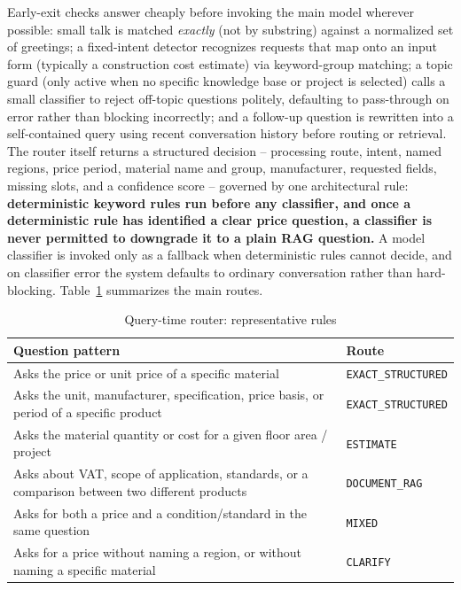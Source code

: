 \documentclass[11pt,a4paper]{article}
\begin{document}
Early-exit checks answer cheaply before invoking the main model wherever
possible: small talk is matched \emph{exactly} (not by substring) against a
normalized set of greetings; a fixed-intent detector recognizes requests
that map onto an input form (typically a construction cost estimate) via
keyword-group matching; a topic guard (only active when no specific
knowledge base or project is selected) calls a small classifier to reject
off-topic questions politely, defaulting to pass-through on error rather
than blocking incorrectly; and a follow-up question is rewritten into a
self-contained query using recent conversation history before routing or
retrieval. The router itself returns a structured decision -- processing
route, intent, named regions, price period, material name and group,
manufacturer, requested fields, missing slots, and a confidence score --
governed by one architectural rule: \textbf{deterministic keyword rules run
before any classifier, and once a deterministic rule has identified a clear
price question, a classifier is never permitted to downgrade it to a plain
RAG question.} A model classifier is invoked only as a fallback when
deterministic rules cannot decide, and on classifier error the system
defaults to ordinary conversation rather than hard-blocking. Table~\ref{tab:router-rules}
summarizes the main routes.

\begin{table}[htbp]
\centering
\caption{Query-time router: representative rules}
\label{tab:router-rules}
\small
\renewcommand{\arraystretch}{1.25}
\begin{tabularx}{\textwidth}{|X|p{}|}
\hline
\rowcolor{tableheader}
\textbf{Question pattern} & \textbf{Route} \\
\hline
Asks the price or unit price of a specific material & \texttt{EXACT\_STRUCTURED} \\
\hline
Asks the unit, manufacturer, specification, price basis, or period of a
specific product & \texttt{EXACT\_STRUCTURED} \\
\hline
Asks the material quantity or cost for a given floor area / project & \texttt{ESTIMATE} \\
\hline
Asks about VAT, scope of application, standards, or a comparison between
two different products & \texttt{DOCUMENT\_RAG} \\
\hline
Asks for both a price and a condition/standard in the same question & \texttt{MIXED} \\
\hline
Asks for a price without naming a region, or without naming a specific
material & \texttt{CLARIFY} \\
\hline
\end{tabularx}
\end{table}
\FloatBarrier
\end{document}

